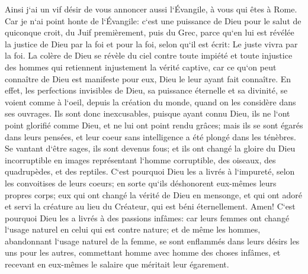\verse Ainsi j`ai un vif désir de vous annoncer aussi l`Évangile, à vous qui êtes à Rome. 
\verse Car je n`ai point honte de l`Évangile: c`est une puissance de Dieu pour le salut de quiconque croit, du Juif premièrement, puis du Grec, 
\verse parce qu`en lui est révélée la justice de Dieu par la foi et pour la foi, selon qu`il est écrit: Le juste vivra par la foi. 
\verse La colère de Dieu se révèle du ciel contre toute impiété et toute injustice des hommes qui retiennent injustement la vérité captive, 
\verse car ce qu`on peut connaître de Dieu est manifeste pour eux, Dieu le leur ayant fait connaître. 
\verse En effet, les perfections invisibles de Dieu, sa puissance éternelle et sa divinité, se voient comme à l`oeil, depuis la création du monde, quand on les considère dans ses ouvrages. Ils sont donc inexcusables, 
\verse puisque ayant connu Dieu, ils ne l`ont point glorifié comme Dieu, et ne lui ont point rendu grâces; mais ils se sont égarés dans leurs pensées, et leur coeur sans intelligence a été plongé dans les ténèbres. 
\verse Se vantant d`être sages, ils sont devenus fous; 
\verse et ils ont changé la gloire du Dieu incorruptible en images représentant l`homme corruptible, des oiseaux, des quadrupèdes, et des reptiles. 
\verse C`est pourquoi Dieu les a livrés à l`impureté, selon les convoitises de leurs coeurs; en sorte qu`ils déshonorent eux-mêmes leurs propres corps; 
\verse eux qui ont changé la vérité de Dieu en mensonge, et qui ont adoré et servi la créature au lieu du Créateur, qui est béni éternellement. Amen! 
\verse C`est pourquoi Dieu les a livrés à des passions infâmes: car leurs femmes ont changé l`usage naturel en celui qui est contre nature; 
\verse et de même les hommes, abandonnant l`usage naturel de la femme, se sont enflammés dans leurs désirs les uns pour les autres, commettant homme avec homme des choses infâmes, et recevant en eux-mêmes le salaire que méritait leur égarement. 

